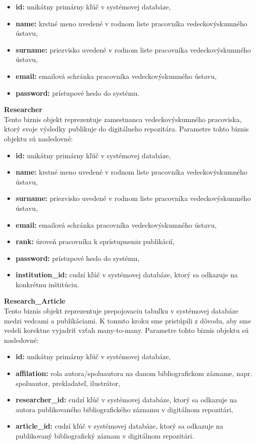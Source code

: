 \documentclass[10pt,oneside,slovak,a4paper]{article}
\begin{document}
\begin{itemize}
\item \textbf{id:} unikátny primárny kľúč v systémovej databáze,
\item \textbf{name:} krstné meno uvedené v rodnom liste pracovníka vedeckovýskumného ústavu,
\item \textbf{surname:} priezvisko uvedené v rodnom liste pracovníka vedeckovýskumného ústavu,
\item \textbf{email:} emailová schránka pracovníka vedeckovýskumného ústavu,
\item \textbf{password:} prístupové heslo do systému.
\end{itemize}

\textbf{Researcher}\\
Tento biznis objekt reprezentuje zamestnanca vedeckovýskumného pracoviska, ktorý svoje výsledky publikuje do digitálneho repozitára. Parametre tohto biznis objektu sú nasledovné:

\begin{itemize}
\item \textbf{id:} unikátny primárny kľúč v systémovej databáze,
\item \textbf{name:} krstné meno uvedené v rodnom liste pracovníka vedeckovýskumného ústavu,
\item \textbf{surname:} priezvisko uvedené v rodnom liste pracovníka vedeckovýskumného ústavu,
\item \textbf{email:} emailová schránka pracovníka vedeckovýskumného ústavu,
\item \textbf{rank:} úroveň pracovníka k sprístupneniu publikácií,
\item \textbf{password:} prístupové heslo do systému,
\item \textbf{institution\_id:} cudzí kľúč v systémovej databáze, ktorý sa odkazuje na konkrétnu inštitúciu.
\end{itemize}

\textbf{Research\_Article}\\
Tento biznis objekt reprezentuje prepojovaciu tabuľku v systémovej databáze medzi vedcami a publikáciami. K tomuto kroku sme pristúpili z dôvodu, aby sme vedeli korektne vyjadriť vzťah many-to-many. Parametre tohto biznis objektu sú nasledovné:

\begin{itemize}
\item \textbf{id:} unikátny primárny kľúč v systémovej databáze,
\item \textbf{affilation:} rola autora/spoluautora na danom bibliografickom zázname, napr. spoluautor, prekladateľ, ilustrátor,
\item \textbf{researcher\_id:} cudzí kľúč v systémovej databáze, ktorý sa odkazuje na autora publikovaného bibliografického záznamu v digitálnom repozitári,
\item \textbf{article\_id:} cudzí kľúč v systémovej databáze, ktorý sa odkazuje na publikovaný bibliografický záznam v digitálnom repozitári.
\end{itemize}
\end{document}
